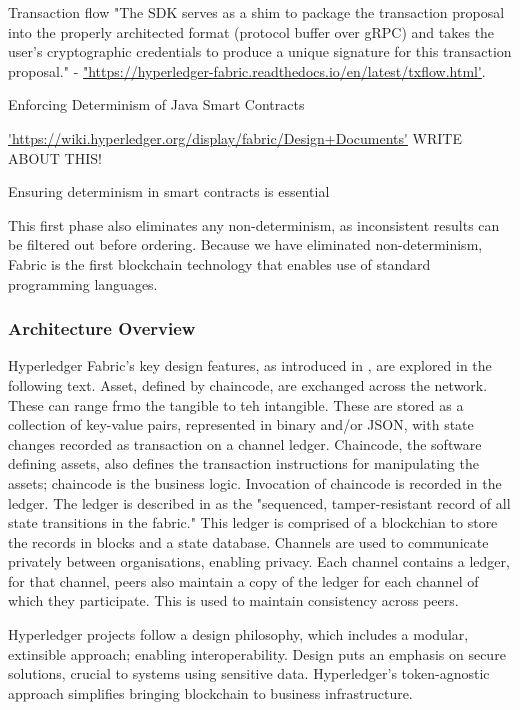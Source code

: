 Transaction flow "The SDK serves as a shim to package the transaction proposal into the properly architected format (protocol buffer over gRPC) and takes the user’s cryptographic credentials to produce a unique signature for this transaction proposal." - \url{"https://hyperledger-fabric.readthedocs.io/en/latest/txflow.html'}.\linebreak[1]


Enforcing Determinism of Java Smart Contracts \cite{spoto_enforcing_2020}

\url{'https://wiki.hyperledger.org/display/fabric/Design+Documents'} WRITE ABOUT THIS!

Ensuring determinism in smart contracts is essential %

This first phase also eliminates any non-determinism, as inconsistent results can be filtered out before ordering.
Because we have eliminated non-determinism, Fabric is the first blockchain technology that enables use of standard programming languages. \cite{androulaki_hyperledger_2018}

\subsubsection{Architecture Overview}

Hyperledger Fabric's key design features, as introduced in \cite{androulaki_hyperledger_2018}, are explored in the following text.
Asset, defined by chaincode, are exchanged across the network. These can range frmo the tangible to teh intangible. These are stored as a collection of key-value pairs, represented in binary and/or JSON, with state changes recorded as transaction on a channel ledger. 
Chaincode, the software defining assets, also defines the transaction instructions for manipulating the assets; chaincode is the business logic. Invocation of chaincode is recorded in the ledger.
The ledger is described in \cite{noauthor_hyperledger_nodate} as the "sequenced, tamper-resistant record of all state transitions in the fabric." This ledger is comprised of a blockchian to store the records in blocks and a state database. 
Channels are used to communicate privately between organisations, enabling privacy.
Each channel contains a ledger, for that channel, peers also maintain a copy of the ledger for each channel of which they participate. This is used to maintain consistency across peers. 


Hyperledger projects follow a design philosophy, which includes a modular, extinsible approach; enabling interoperability.
Design puts an emphasis on secure solutions, crucial to systems using sensitive data.
Hyperledger's token-agnostic approach simplifies bringing blockchain to business infrastructure. \cite{noauthor_hyperledger_2017}

